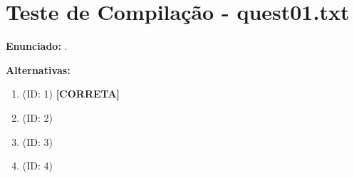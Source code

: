 \documentclass[10pt,a4paper]{article}
\begin{document}
    \section*{Teste de Compilação - quest01.txt}

    \noindent \textbf{Enunciado:} .

    \vspace{0.3cm}
    \noindent \textbf{Alternativas:}
    \begin{enumerate}[label=\alph*)]
        \item (ID: 1) \textbf{ [CORRETA]}
    \item (ID: 2) \textbf{}
    \item (ID: 3) \textbf{}
    \item (ID: 4) \textbf{}
\end{enumerate}
    
\end{document}
